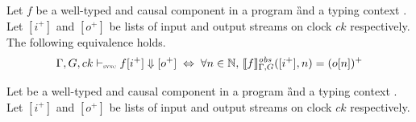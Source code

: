 \begin{theorem}[Equivalence]
    \label{thm:semantics:grsync:theorems:equivalence}
    Let $f$ be a well-typed and causal component in a program \G and a typing context \tyCtx.
    Let $[i^+]$ and $[o^+]$ be lists of input and output streams on clock $ck$ respectively. The
    following equivalence holds.
    \begin{equation*}
        \Gamma, G, ck \vdash_{\textnormal{\tiny\textsc{sync}}} f[i^+] \Downarrow [o^+] \; \Leftrightarrow \; \forall n \in \mathbb{N}, \,
        \llbracket f \rrbracket^\textit{obs}_{\Gamma, G}([i^+], n) = (o[n])^+
    \end{equation*}
\end{theorem}
\begin{skippableproof}
    Let  be a well-typed and causal component in a
    program \G and a typing context \tyCtx. Let $[i^+]$ and $[o^+]$ be lists of input and output
    streams on clock $ck$ respectively.


\end{skippableproof}
